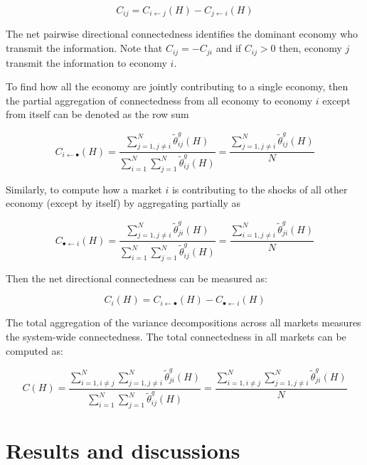 \documentclass[]{elsarticle} %
\begin{document}
\[{{C}_{ij}}={{C}_{i\leftarrow j}}\left( H \right)-{{C}_{j\leftarrow i}}\left( H \right)\]

The net pairwise directional connectedness identifies the dominant
economy who transmit the information. Note that
\({{C}_{ij}}=-{{C}_{ji}}\) and if \({{C}_{ij}}>0\) then, economy
\(j\)transmit the information to economy \(i\).

To find how all the economy are jointly contributing to a single
economy, then the partial aggregation of connectedness from all economy
to economy \(i\) except from itself can be denoted as the row sum

\[{{C}_{i\leftarrow \bullet }}\left( H \right)=\frac{\sum\nolimits_{j=1,j\ne i}^{N}{\tilde{\theta }_{ij}^{g}\left( H \right)}}{\sum\nolimits_{i=1}^{N}{\sum\nolimits_{j=1}^{N}{\tilde{\theta }_{ij}^{g}\left( H \right)}}}=\frac{\sum\nolimits_{j=1,j\ne i}^{N}{\tilde{\theta }_{ij}^{g}\left( H \right)}}{N}\]

Similarly, to compute how a market \(i\) is contributing to the shocks
of all other economy (except by itself) by aggregating partially as

\[{{C}_{\bullet \leftarrow i}}\left( H \right)=\frac{\sum\nolimits_{j=1,j\ne i}^{N}{\tilde{\theta }_{ji}^{g}\left( H \right)}}{\sum\nolimits_{i=1}^{N}{\sum\nolimits_{j=1}^{N}{\tilde{\theta }_{ij}^{g}\left( H \right)}}}=\frac{\sum\nolimits_{i=1,j\ne i}^{N}{\tilde{\theta }_{ji}^{g}\left( H \right)}}{N}\]

Then the net directional connectedness can be measured as:

\[{{C}_{i}}\left( H \right)={{C}_{i\leftarrow \bullet }}\left( H \right)-{{C}_{\bullet \leftarrow i}}\left( H \right)\]

The total aggregation of the variance decompositions across all markets
measures the system-wide connectedness. The total connectedness in all
markets can be computed as:

\[C\left( H \right)=\frac{\sum\nolimits_{i=1,i\ne j}^{N}{\sum\nolimits_{j=1,j\ne i}^{N}{\tilde{\theta }_{ji}^{g}\left( H \right)}}}{\sum\nolimits_{i=1}^{N}{\sum\nolimits_{j=1}^{N}{\tilde{\theta }_{ij}^{g}\left( H \right)}}}=\frac{\sum\nolimits_{i=1,i\ne j}^{N}{\sum\nolimits_{j=1,j\ne i}^{N}{\tilde{\theta }_{ji}^{g}\left( H \right)}}}{N}\]

\section{Results and discussions}\label{results-and-discussions}
\end{document}

